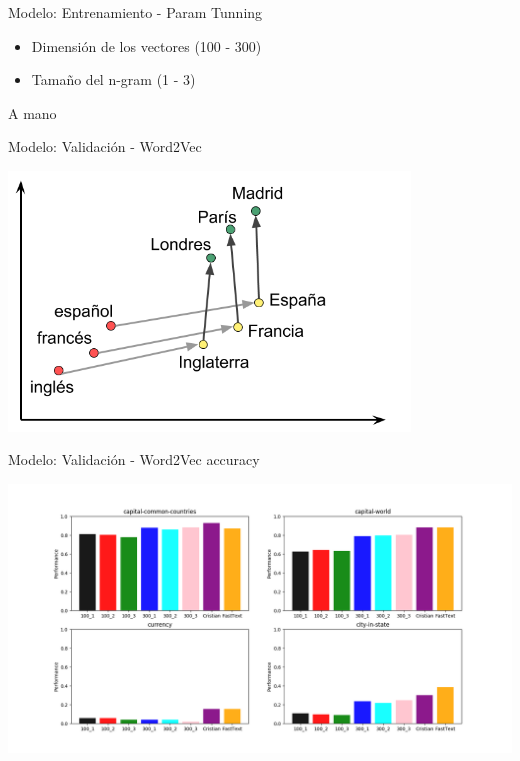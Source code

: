 \documentclass[10pt]{beamer}
\begin{document}
\begin{frame}{Modelo: Entrenamiento - Param Tunning}
  \begin{itemize}
    \item Dimensión de los vectores (100 - 300)
    \item Tamaño del n-gram (1 - 3)
  \end{itemize}
  \begin{center}
    A mano
  \end{center}
\end{frame}


\begin{frame}{Modelo: Validación - Word2Vec}
  \begin{center}
    \includegraphics[width=0.8\textwidth]{word_vec.png}
  \end{center}
\end{frame}

\begin{frame}{Modelo: Validación - Word2Vec accuracy}

  \begin{center}
    \includegraphics[width=1\textwidth]{plot1.png}
  \end{center}

\end{frame}
\end{document}
